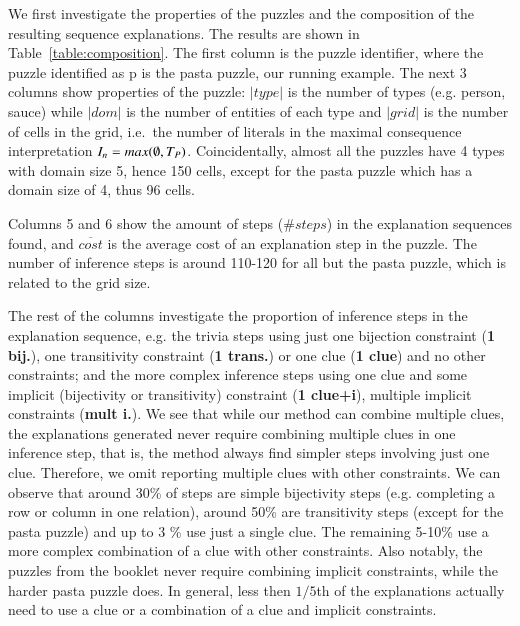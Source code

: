 We first investigate the properties of the puzzles and the composition of the resulting sequence explanations. The results are shown in Table~\ref{table:composition}. The first column is the puzzle identifier, where the puzzle identified as p is the pasta puzzle, our running example. 
The next 3 columns show properties of the puzzle:
$|type|$ is the number of types (e.g. person, sauce) while $|dom|$ is the number of entities of each type and $|grid|$ is the number of cells in the grid, i.e.\ the number of literals in the maximal consequence interpretation $I_n=max(\emptyset, T_P)$.
Coincidentally, almost all the puzzles have 4 types with domain size 5,  hence 150 cells, except for the pasta puzzle which has a domain size of 4, thus 96 cells.

Columns 5 and 6 show the amount of steps ($\# steps$) in the explanation sequences found, and $\overline{cost}$ is the average cost of an explanation step in the puzzle. The number of inference steps is around 110-120 for all but the pasta puzzle, which is related to the grid size.

The rest of the columns investigate the proportion of inference steps in the explanation sequence, e.g. the trivia steps using just one bijection constraint (\textbf{1 bij.}), one transitivity constraint (\textbf{1 trans.}) or one clue (\textbf{1 clue}) and no other constraints; and the more complex inference steps using one clue and some implicit (bijectivity or transitivity) constraint (\textbf{1 clue+i}), multiple implicit constraints (\textbf{mult i.}). 
We see that while our method can combine multiple clues, the explanations generated never require combining multiple clues in one inference step, that is, the method always find simpler steps involving just one clue. 
Therefore, we omit reporting multiple clues with other constraints. 
We can observe that around 30\% of steps are simple bijectivity steps (e.g. completing a row or column in one relation), around 50\% are transitivity steps (except for the pasta puzzle) and up to 3 \% use just a single clue. 
The remaining 5-10\% use a more complex combination of a clue with other constraints. 
Also notably, the puzzles from the booklet never require combining implicit constraints, while the harder pasta puzzle does. 
In general, less then $1/5$th of the explanations actually need to use a clue or a combination of a clue and implicit constraints.

